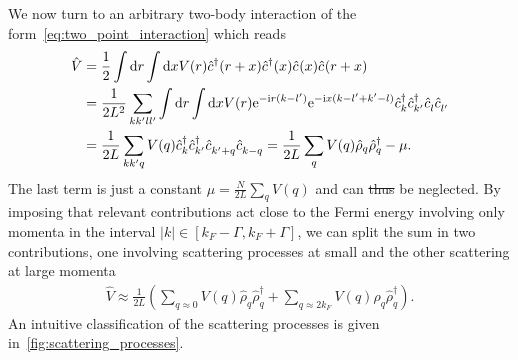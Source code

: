 \documentclass{svmono}
\def\ri{\mathrm i}
\def\re{\mathrm e}
\def\rd{\mathrm d}
\def\pdag{{\vphantom\dag}}
\newcommand{\brlr}[1]{\left( #1 \right)}
\providecommand{\DIFdeltex}[1]{{\protect\color{red}\sout{#1}}}                      %
\providecommand{\DIFaddbegin}{} %
\providecommand{\DIFaddend}{} %
\providecommand{\DIFdelbegin}{} %
\providecommand{\DIFdelend}{} %
\providecommand{\DIFdel}[1]{\texorpdfstring{\DIFdeltex{#1}}{}} %
\newcommand{\DIFscaledelfig}{0.5}
\newlength{\DIFdelgraphicswidth} %
\newlength{\DIFdelgraphicsheight} %
\newcommand{\DIFaddincludegraphics}[2][]{{\color{blue}\fbox{\DIFOincludegraphics[#1]{#2}}}} %
\newcommand{\DIFdelincludegraphics}[2][]{%
\sbox{\DIFdelgraphicsbox}{\DIFOincludegraphics[#1]{#2}}%
\settoboxwidth{\DIFdelgraphicswidth}{\DIFdelgraphicsbox} %
\settoboxtotalheight{\DIFdelgraphicsheight}{\DIFdelgraphicsbox} %
\scalebox{\DIFscaledelfig}{%
\parbox[b]{\DIFdelgraphicswidth}{\usebox{\DIFdelgraphicsbox}\\[-\baselineskip] \rule{\DIFdelgraphicswidth}{0em}}\llap{\resizebox{\DIFdelgraphicswidth}{\DIFdelgraphicsheight}{%
\setlength{\unitlength}{\DIFdelgraphicswidth}%
\begin{picture}(1,1)%
\thicklines\linethickness{2pt} %
{\color[rgb]{1,0,0}\put(0,0){\framebox(1,1){}}}%
{\color[rgb]{1,0,0}\put(0,0){\line( 1,1){1}}}%
{\color[rgb]{1,0,0}\put(0,1){\line(1,-1){1}}}%
\end{picture}%
}\hspace*{3pt}}} %
} %
\DeclareRobustCommand{\DIFaddbegin}{\DIFOaddbegin \let\includegraphics\DIFaddincludegraphics} %
\DeclareRobustCommand{\DIFaddend}{\DIFOaddend \let\includegraphics\DIFOincludegraphics} %
\DeclareRobustCommand{\DIFdelbegin}{\DIFOdelbegin \let\includegraphics\DIFdelincludegraphics} %
\DeclareRobustCommand{\DIFdelend}{\DIFOaddend \let\includegraphics\DIFOincludegraphics} %
\begin{document}
We now turn to an arbitrary two-body interaction of the form~\cref{eq:two_point_interaction} which reads
\DIFdelbegin %
\DIFdelend \DIFaddbegin \begin{align}
    \hat V
&= \frac12\int\rd r\int\rd x V(r)\hat c^\dag(r+x)\hat c^\dag(x)\hat c^\pdag(x)\hat c^\pdag(r+x)
    \\
    &= \frac1{2L^2}\sum_{kk'll'}\int\rd r\int\rd x V(r)\re^{-\ri r(k-l')}\re^{-\ri x(k-l'+k'-l)}\hat c^\dag_k\hat c^\dag_{k'}\hat c^\pdag_l\hat c^\pdag_{l'}
\\
    &= \frac1{2L}\sum_{kk'q}V(q)\hat c^\dag_k\hat c^\dag_{k'}\hat c^\pdag_{k'+q}\hat c^\pdag_{k-q}
    = \frac1{2L}\sum_{q}V(q)\hat\rho_q\hat\rho^\dag_{q} - \mu.
    \label{eq:two_body_interaction_momentum_space}
\end{align}\DIFaddend 
The last term is just a constant $\mu = \frac N{2L}\sum_qV(q)$ and can \DIFdelbegin \DIFdel{thus }\DIFdelend be neglected.
By imposing that relevant contributions act close to the Fermi energy involving only momenta in the interval $|k|\in[k_F-\Gamma,k_F+\Gamma]$, we can split the sum in two contributions, one involving scattering processes at small and the other scattering at large momenta
\begin{align}
    \hat V \approx \frac1{2L}\brlr{\sum_{q\approx0}V(q)\hat\rho_{q}\hat\rho^\dag_{q} + \sum_{q\approx2k_F}V(q)\hat\rho_{q}\hat\rho^\dag_{q}}.
\end{align}
An intuitive classification of the scattering processes is given in~\cref{fig:scattering_processes}.
\end{document}
